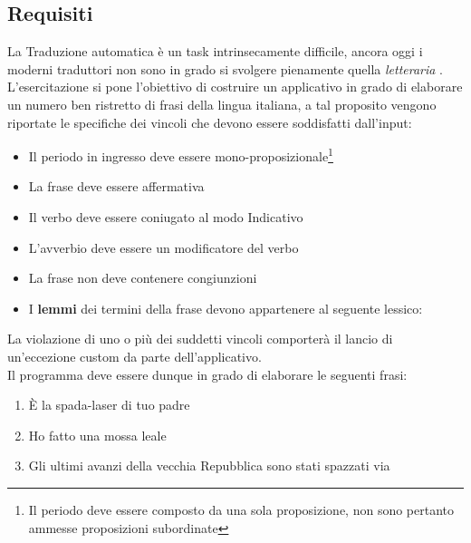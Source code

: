 \subsection{Requisiti}
\label{sec:requisiti}
La Traduzione automatica è un task intrinsecamente difficile, ancora oggi i moderni traduttori non sono in grado si svolgere pienamente quella \textit{letteraria} \cite{book}. \\
L'esercitazione  si pone l'obiettivo di costruire un applicativo in grado di elaborare un numero ben ristretto di frasi della lingua italiana, a tal proposito vengono riportate le specifiche dei vincoli che devono essere soddisfatti dall'input:
\begin{itemize}[label=$\ast$]
	\item Il periodo in ingresso deve essere mono-proposizionale\footnote{Il periodo deve essere composto da una sola proposizione, non sono pertanto ammesse proposizioni subordinate} 
	\item La frase deve essere affermativa
	\item Il verbo deve essere coniugato al modo Indicativo
	\item L'avverbio deve essere un modificatore del verbo
	\item La frase non deve contenere congiunzioni
	\item I \textbf{lemmi} dei termini della frase devono appartenere al seguente lessico:
	  
	
	
\end{itemize}
La violazione di uno o più dei suddetti vincoli comporterà il lancio di un'eccezione custom da parte dell'applicativo. \\
Il programma deve essere dunque in grado di elaborare le seguenti frasi:
\begin{enumerate}[label=(\roman*)]
	\item È la spada-laser di tuo padre
	\item Ho fatto una mossa leale
	\item Gli ultimi avanzi della vecchia Repubblica sono stati spazzati via
\end{enumerate}


